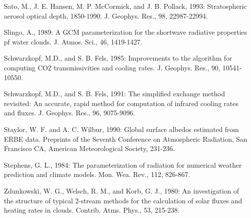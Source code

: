 Sato, M., J. E. Hansen, M. P. Mc\+Cormick, and J. B. Pollack, 1993\+: Stratospheric aerosol optical depth, 1850-\/1990. J. Geophys. Res., 98, 22987-\/22994.

Slingo, A., 1989\+: A G\+CM parameterization for the shortwave radiative properties pf water clouds. J. Atmos. Sci., 46, 1419-\/1427.

Schwarzkopf, M.\+D., and S. B. Fels, 1985\+: Improvements to the algorithm for computing C\+O2 transmissivities and cooling rates. J. Geophys. Res., 90, 10541-\/10550.

Schwarzkopf, M.\+D., and S. B. Fels, 1991\+: The simplified exchange method revisited\+: An accurate, rapid method for computation of infrared cooling rates and fluxes. J. Geophys. Res., 96, 9075-\/9096.

Staylor, W. F. and A. C. Wilbur, 1990\+: Global surface albedos estimated from E\+R\+BE data. Preprints of the Seventh Conference on Atmospheric Radiation, San Francisco CA, American Meteorological Society, 231-\/236.

Stephens, G. L., 1984\+: The parameterization of radiation for numerical weather prediction and climate models. Mon. Wea. Rev., 112, 826-\/867.

Zdunkowski, W. G., Welsch, R. M., and Korb, G. J., 1980\+: An investigation of the structure of typical 2-\/stream methods for the calculation of solar fluxes and heating rates in clouds. Contrib. Atms. Phys., 53, 215-\/238. 